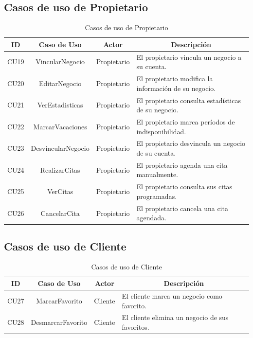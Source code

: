 \newpage

\subsection{Casos de uso de Propietario}

\begin{table}[h]
\centering
\begin{tabular}{|c|c|c|p{6cm}|}
\hline
\textbf{ID}\cellcolor[RGB]{217,217,217} &
\textbf{Caso de Uso}\cellcolor[RGB]{217,217,217} &
\textbf{Actor}\cellcolor[RGB]{217,217,217} & 
\multicolumn{1}{|c|}{\textbf{Descripción}\cellcolor[RGB]{217,217,217}} \\
\hline

CU19 & VincularNegocio & Propietario & El propietario vincula un negocio a su cuenta. \\
\hline
CU20 & EditarNegocio & Propietario & El propietario modifica la información de su negocio. \\
\hline
CU21 & VerEstadisticas & Propietario & El propietario consulta estadísticas de su negocio. \\
\hline
CU22 & MarcarVacaciones & Propietario & El propietario marca períodos de indisponibilidad. \\
\hline
CU23 & DesvincularNegocio & Propietario & El propietario desvincula un negocio de su cuenta. \\
\hline
CU24 & RealizarCitas & Propietario & El propietario agenda una cita manualmente. \\
\hline
CU25 & VerCitas & Propietario & El propietario consulta sus citas programadas. \\
\hline
CU26 & CancelarCita & Propietario & El propietario cancela una cita agendada. \\
\hline

\end{tabular}
\caption{Casos de uso de Propietario}
\label{tab:propietario}
\end{table}

\newpage

\subsection{Casos de uso de Cliente}

\begin{table}[h]
\centering
\begin{tabular}{|c|c|c|p{6cm}|}
\hline
\textbf{ID}\cellcolor[RGB]{217,217,217} &
\textbf{Caso de Uso}\cellcolor[RGB]{217,217,217} &
\textbf{Actor}\cellcolor[RGB]{217,217,217} &
\multicolumn{1}{|c|}{\textbf{Descripción}\cellcolor[RGB]{217,217,217}} \\
\hline

CU27 & MarcarFavorito & Cliente & El cliente marca un negocio como favorito. \\
\hline
CU28 & DesmarcarFavorito & Cliente & El cliente elimina un negocio de sus favoritos. \\
\hline

\end{tabular}
\caption{Casos de uso de Cliente}
\label{tab:cliente}
\end{table}

